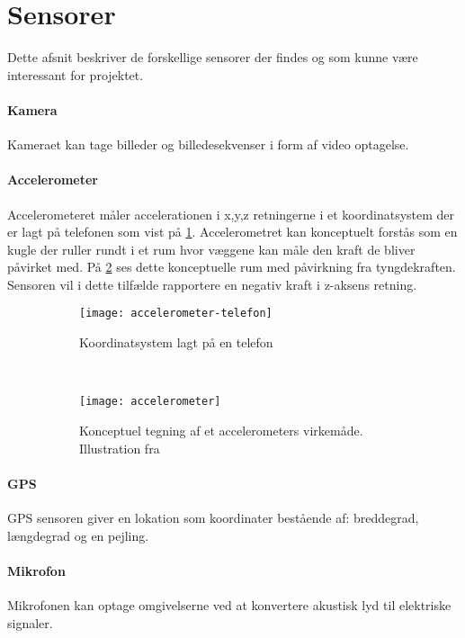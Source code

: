 \section{Sensorer}
Dette afsnit beskriver de forskellige sensorer der findes og som kunne være interessant for projektet. 

\paragraph{Kamera}
Kameraet kan tage billeder og billedesekvenser i form af video optagelse.

\paragraph{Accelerometer}
Accelerometeret måler accelerationen i x,y,z retningerne i et koordinatsystem der er lagt på telefonen som vist på \cref{analyse:accelerometer:koo}.
Accelerometret kan konceptuelt forstås som en kugle der ruller rundt i et rum hvor væggene kan måle den kraft de bliver påvirket med.
På \cref{analyse:accelerometer:kraft} ses dette konceptuelle rum med påvirkning fra tyngdekraften. 
Sensoren vil i dette tilfælde rapportere en negativ kraft i z-aksens retning.

\begin{figure}[h]
	\centering
	\begin{subfigure}[b]{0.47\textwidth}
		\centering
		\texttt{[image: accelerometer-telefon]}
		\caption{Koordinatsystem lagt på en telefon}
		\label{analyse:accelerometer:koo}
	\end{subfigure}
	~
	\begin{subfigure}[b]{0.47\textwidth}
		\centering
		\texttt{[image: accelerometer]}
		\caption{Konceptuel tegning af et accelerometers virkemåde. Illustration fra \citet{accelerometer}}
		\label{analyse:accelerometer:kraft}
	\end{subfigure}
	\caption{}
	\label{accelerometer}
\end{figure} 

\paragraph{GPS}
GPS sensoren giver en lokation som koordinater bestående af: breddegrad, længdegrad og en pejling.

\paragraph{Mikrofon}
Mikrofonen kan optage omgivelserne ved at konvertere akustisk lyd til elektriske signaler.

